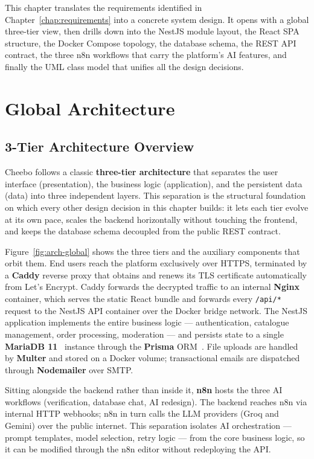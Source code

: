 \documentclass[12pt, a4paper, oneside]{report}
\newenvironment{chapterintro}{%
  \begin{mdframed}[backgroundcolor=cheebolightgray,linecolor=cheeboblue,linewidth=1pt]
  \small\itshape
}{%
  \end{mdframed}
}
\begin{document}
\begin{chapterintro}
  This chapter translates the requirements identified in
  Chapter~\ref{chap:requirements} into a concrete system design. It opens
  with a global three-tier view, then drills down into the NestJS module
  layout, the React SPA structure, the Docker Compose topology, the
  database schema, the REST API contract, the three n8n workflows that
  carry the platform's AI features, and finally the UML class model that
  unifies all the design decisions.
\end{chapterintro}

\section{Global Architecture}

\subsection{3-Tier Architecture Overview}

Cheebo follows a classic \textbf{three-tier architecture} that separates
the user interface (presentation), the business logic (application), and
the persistent data (data) into three independent layers. This separation
is the structural foundation on which every other design decision in this
chapter builds: it lets each tier evolve at its own pace, scales the
backend horizontally without touching the frontend, and keeps the database
schema decoupled from the public REST contract.

Figure~\ref{fig:arch-global} shows the three tiers and the auxiliary
components that orbit them. End users reach the platform exclusively
over HTTPS, terminated by a \textbf{Caddy} reverse proxy that obtains
and renews its TLS certificate automatically from Let's Encrypt. Caddy
forwards the decrypted traffic to an internal \textbf{Nginx} container,
which serves the static React bundle and forwards every
\texttt{/api/*} request to the NestJS API container over the Docker
bridge network. The NestJS
application implements the entire business logic --- authentication,
catalogue management, order processing, moderation --- and persists state
to a single \textbf{MariaDB 11}~\cite{mariadb} instance through the
\textbf{Prisma} ORM~\cite{prisma}.
File uploads are handled by \textbf{Multer} and stored on a Docker
volume; transactional emails are dispatched through \textbf{Nodemailer}
over SMTP.

Sitting alongside the backend rather than inside it, \textbf{n8n} hosts
the three AI workflows (verification, database chat, AI redesign). The
backend reaches n8n via internal HTTP webhooks; n8n in turn calls the
LLM providers (Groq and Gemini) over the public internet. This
separation isolates AI orchestration --- prompt templates, model
selection, retry logic --- from the core business logic, so it can be
modified through the n8n editor without redeploying the API.
\end{document}

